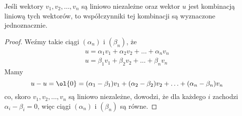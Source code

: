\begin{theorem}
    Jeśli wektory $v_1, v_2, \ldots, v_n$ są liniowo niezależne oraz wektor $u$ jest kombinacją liniową tych wektorów, to współczynniki tej kombinacji są wyznaczone jednoznacznie.
\end{theorem}
\begin{proof}
    Weźmy takie ciągi $(\alpha_n)$ i $(\beta_n)$, że
    \begin{align*}
        u = \alpha_1v_1 + \alpha_2v_2 + \ldots + \alpha_nv_n \\
        u = \beta_1v_1 + \beta_2v_2 + \ldots + \beta_nv_n
    \end{align*}
    Mamy
    $$ u - u = \ol{0} = (\alpha_1 - \beta_1)v_1 + (\alpha_2 - \beta_2)v_2 + \ldots + (\alpha_n - \beta_n)v_n $$
    co, skoro $v_1, v_2, \ldots, v_n$ są liniowo niezależne, dowodzi, że dla każdego $i$ zachodzi $\alpha_i - \beta_i = 0$, więc ciągi $(\alpha_n)$ i $(\beta_n)$ są równe.
\end{proof}